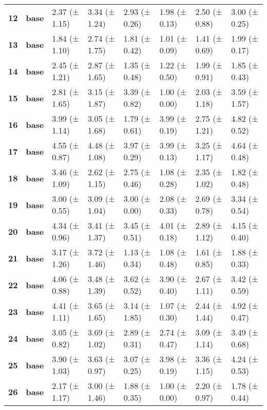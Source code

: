 \begin{longtable}{llllllll}
\cline{1-8}
\textbf{12} & \textbf{base} & 2.37 (± 1.15) & 3.34 (± 1.24) & 2.93 (± 0.26) & 1.98 (± 0.13) & 2.50 (± 0.88) & 3.00 (± 0.25) \\
\cline{1-8}
\textbf{13} & \textbf{base} & 1.84 (± 1.10) & 2.74 (± 1.75) & 1.81 (± 0.42) & 1.01 (± 0.09) & 1.41 (± 0.69) & 1.99 (± 0.17) \\
\cline{1-8}
\textbf{14} & \textbf{base} & 2.45 (± 1.21) & 2.87 (± 1.65) & 1.35 (± 0.48) & 1.22 (± 0.50) & 1.99 (± 0.91) & 1.85 (± 0.43) \\
\cline{1-8}
\textbf{15} & \textbf{base} & 2.81 (± 1.65) & 3.15 (± 1.87) & 3.39 (± 0.82) & 1.00 (± 0.00) & 2.03 (± 1.18) & 3.59 (± 1.57) \\
\cline{1-8}
\textbf{16} & \textbf{base} & 3.99 (± 1.14) & 3.05 (± 1.68) & 1.79 (± 0.61) & 3.99 (± 0.19) & 2.75 (± 1.21) & 4.82 (± 0.52) \\
\cline{1-8}
\textbf{17} & \textbf{base} & 4.55 (± 0.87) & 4.48 (± 1.08) & 3.97 (± 0.29) & 3.99 (± 0.13) & 3.25 (± 1.17) & 4.64 (± 0.48) \\
\cline{1-8}
\textbf{18} & \textbf{base} & 3.46 (± 1.09) & 2.62 (± 1.15) & 2.75 (± 0.46) & 1.08 (± 0.28) & 2.35 (± 1.02) & 1.82 (± 0.48) \\
\cline{1-8}
\textbf{19} & \textbf{base} & 3.00 (± 0.55) & 3.09 (± 1.04) & 3.00 (± 0.00) & 2.08 (± 0.33) & 2.69 (± 0.78) & 3.34 (± 0.54) \\
\cline{1-8}
\textbf{20} & \textbf{base} & 4.34 (± 0.96) & 3.41 (± 1.37) & 3.45 (± 0.51) & 4.01 (± 0.18) & 2.89 (± 1.12) & 4.15 (± 0.40) \\
\cline{1-8}
\textbf{21} & \textbf{base} & 3.17 (± 1.26) & 3.72 (± 1.46) & 1.13 (± 0.34) & 1.08 (± 0.48) & 1.61 (± 0.85) & 1.88 (± 0.33) \\
\cline{1-8}
\textbf{22} & \textbf{base} & 4.06 (± 0.88) & 3.48 (± 1.39) & 3.62 (± 0.52) & 3.90 (± 0.40) & 2.67 (± 1.11) & 3.42 (± 0.59) \\
\cline{1-8}
\textbf{23} & \textbf{base} & 4.41 (± 1.11) & 3.65 (± 1.65) & 3.14 (± 1.85) & 1.07 (± 0.30) & 2.44 (± 1.44) & 4.92 (± 0.47) \\
\cline{1-8}
\textbf{24} & \textbf{base} & 3.05 (± 0.82) & 3.69 (± 1.02) & 2.89 (± 0.31) & 2.74 (± 0.47) & 3.09 (± 1.14) & 3.49 (± 0.68) \\
\cline{1-8}
\textbf{25} & \textbf{base} & 3.90 (± 1.03) & 3.63 (± 0.97) & 3.07 (± 0.25) & 3.98 (± 0.19) & 3.36 (± 1.15) & 4.24 (± 0.53) \\
\cline{1-8}
\textbf{26} & \textbf{base} & 2.17 (± 1.17) & 3.00 (± 1.46) & 1.88 (± 0.35) & 1.00 (± 0.00) & 2.20 (± 0.97) & 1.78 (± 0.44) \\

\end{longtable}
